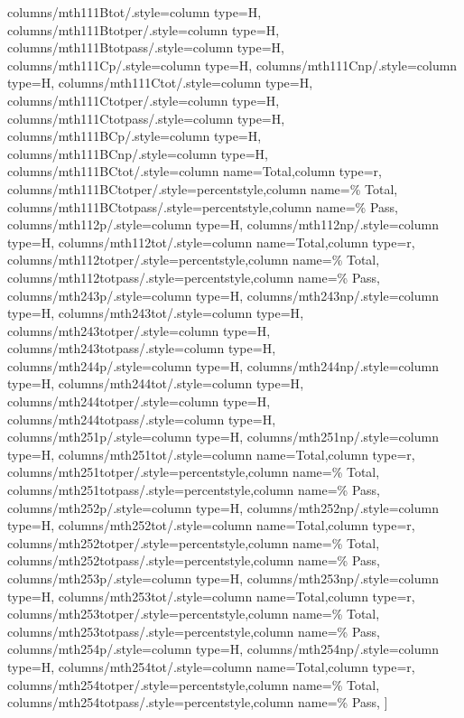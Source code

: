 \documentclass[varwidth]{standalone}
\begin{document}
{    columns/mth111Btot/.style={column type=H},
    columns/mth111Btotper/.style={column type=H},
    columns/mth111Btotpass/.style={column type=H},
    columns/mth111Cp/.style={column type=H},
    columns/mth111Cnp/.style={column type=H},
    columns/mth111Ctot/.style={column type=H},
    columns/mth111Ctotper/.style={column type=H},
    columns/mth111Ctotpass/.style={column type=H},
    columns/mth111BCp/.style={column type=H},
    columns/mth111BCnp/.style={column type=H},
    columns/mth111BCtot/.style={column name=Total,column type=r},
    columns/mth111BCtotper/.style={percentstyle,column name=\% Total},
    columns/mth111BCtotpass/.style={percentstyle,column name=\% Pass},
    columns/mth112p/.style={column type=H},
    columns/mth112np/.style={column type=H},
    columns/mth112tot/.style={column name=Total,column type=r},
    columns/mth112totper/.style={percentstyle,column name=\% Total},
    columns/mth112totpass/.style={percentstyle,column name=\% Pass},
    columns/mth243p/.style={column type=H},
    columns/mth243np/.style={column type=H},
    columns/mth243tot/.style={column type=H},
    columns/mth243totper/.style={column type=H},
    columns/mth243totpass/.style={column type=H},
    columns/mth244p/.style={column type=H},
    columns/mth244np/.style={column type=H},
    columns/mth244tot/.style={column type=H},
    columns/mth244totper/.style={column type=H},
    columns/mth244totpass/.style={column type=H},
    columns/mth251p/.style={column type=H},
    columns/mth251np/.style={column type=H},
    columns/mth251tot/.style={column name=Total,column type=r},
    columns/mth251totper/.style={percentstyle,column name=\% Total},
    columns/mth251totpass/.style={percentstyle,column name=\% Pass},
    columns/mth252p/.style={column type=H},
    columns/mth252np/.style={column type=H},
    columns/mth252tot/.style={column name=Total,column type=r},
    columns/mth252totper/.style={percentstyle,column name=\% Total},
    columns/mth252totpass/.style={percentstyle,column name=\% Pass},
    columns/mth253p/.style={column type=H},
    columns/mth253np/.style={column type=H},
    columns/mth253tot/.style={column name=Total,column type=r},
    columns/mth253totper/.style={percentstyle,column name=\% Total},
    columns/mth253totpass/.style={percentstyle,column name=\% Pass},
    columns/mth254p/.style={column type=H},
    columns/mth254np/.style={column type=H},
    columns/mth254tot/.style={column name=Total,column type=r},
    columns/mth254totper/.style={percentstyle,column name=\% Total},
    columns/mth254totpass/.style={percentstyle,column name=\% Pass},
]{\diversitydata}
}
\end{document}
